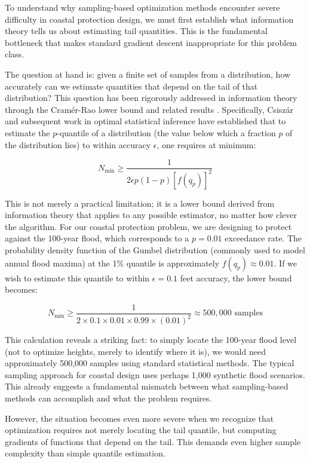 \documentclass[review]{elsarticle}
\begin{document}
To understand why sampling-based optimization methods encounter severe difficulty in coastal protection design, we must first establish what information theory tells us about estimating tail quantities. This is the fundamental bottleneck that makes standard gradient descent inappropriate for this problem class.

The question at hand is: given a finite set of samples from a distribution, how accurately can we estimate quantities that depend on the tail of that distribution? This question has been rigorously addressed in information theory through the Cramér-Rao lower bound and related results \cite{crameroao1946}. Specifically, Csiszár \cite{csiszar1975divergence} and subsequent work in optimal statistical inference have established that to estimate the $p$-quantile of a distribution (the value below which a fraction $p$ of the distribution lies) to within accuracy $\epsilon$, one requires at minimum:

\begin{equation}
N_{\min} \geq \frac{1}{2\epsilon p(1-p)[f(q_p)]^2}
\label{eq:shannon_bound}
\end{equation}

This is not merely a practical limitation; it is a lower bound derived from information theory that applies to any possible estimator, no matter how clever the algorithm. For our coastal protection problem, we are designing to protect against the 100-year flood, which corresponds to a $p = 0.01$ exceedance rate. The probability density function of the Gumbel distribution (commonly used to model annual flood maxima) at the 1\% quantile is approximately $f(q_p) \approx 0.01$. If we wish to estimate this quantile to within $\epsilon = 0.1$ feet accuracy, the lower bound becomes:

\begin{equation}
N_{\min} \geq \frac{1}{2 \times 0.1 \times 0.01 \times 0.99 \times (0.01)^2} \approx 500,000 \text{ samples}
\end{equation}

This calculation reveals a striking fact: to simply locate the 100-year flood level (not to optimize heights, merely to identify where it is), we would need approximately 500,000 samples using standard statistical methods. The typical sampling approach for coastal design uses perhaps 1,000 synthetic flood scenarios. This already suggests a fundamental mismatch between what sampling-based methods can accomplish and what the problem requires.

However, the situation becomes even more severe when we recognize that optimization requires not merely locating the tail quantile, but computing gradients of functions that depend on the tail. This demands even higher sample complexity than simple quantile estimation.
\end{document}

